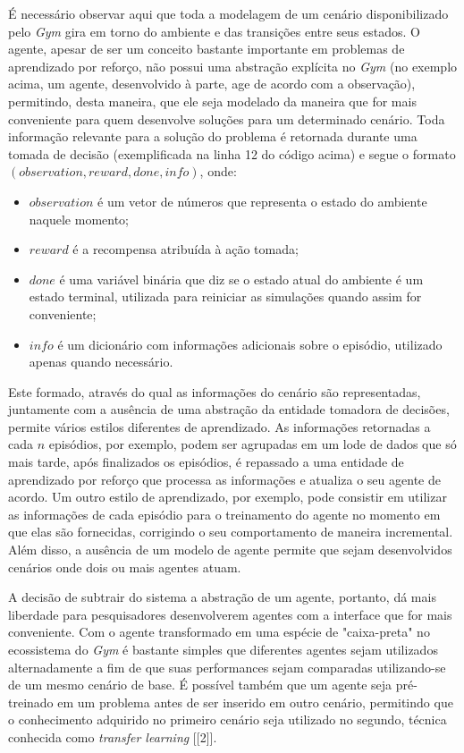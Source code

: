\documentclass[cic,tc]{iiufrgs}
\begin{document}
É necessário observar aqui que toda a modelagem de um cenário disponibilizado
pelo \textit{Gym} gira em torno do ambiente e das transições entre seus estados.
O agente, apesar de ser um conceito bastante importante em problemas de
aprendizado por reforço, não possui uma abstração explícita no \textit{Gym} (no
exemplo acima, um agente, desenvolvido à parte, age de acordo com a observação),
permitindo, desta maneira, que ele seja modelado da maneira que for mais
conveniente para quem desenvolve soluções para um determinado cenário. Toda
informação relevante para a solução do problema é retornada durante uma tomada
de decisão (exemplificada na linha 12 do código acima) e segue o formato
$(observation, reward, done, info)$, onde:

\begin{itemize}
  \item $observation$ é um vetor de números que representa o estado do ambiente
  naquele momento;
  \item $reward$ é a recompensa atribuída à ação tomada;
  \item $done$ é uma variável binária que diz se o estado atual do ambiente é
  um estado terminal, utilizada para reiniciar as simulações quando assim for
  conveniente;
  \item $info$ é um dicionário com informações adicionais sobre o episódio,
  utilizado apenas quando necessário.
\end{itemize}

Este formado, através do qual as informações do cenário são representadas,
juntamente com a ausência de uma abstração da entidade tomadora de decisões,
permite vários estilos diferentes de aprendizado. As informações retornadas a
cada $n$ episódios, por exemplo, podem ser agrupadas em um lode de dados que
só mais tarde, após finalizados os episódios, é repassado a uma entidade de
aprendizado por reforço que processa as informações e atualiza o seu agente de
acordo. Um outro estilo de aprendizado, por exemplo, pode consistir em utilizar
as informações de cada episódio para o treinamento do agente no momento em que
elas são fornecidas, corrigindo o seu comportamento de maneira incremental. Além
disso, a ausência de um modelo de agente permite que sejam desenvolvidos
cenários onde dois ou mais agentes atuam.


A decisão de subtrair do sistema a abstração de um agente, portanto, dá mais
liberdade para pesquisadores desenvolverem agentes com a interface que for mais
conveniente. Com o agente transformado em uma espécie de "caixa-preta" no
ecossistema do \textit{Gym} é bastante simples que diferentes agentes sejam
utilizados alternadamente a fim de que suas performances sejam comparadas
utilizando-se de um mesmo cenário de base. É possível também que um agente seja
pré-treinado em um problema antes de ser inserido em outro cenário, permitindo
que o conhecimento adquirido no primeiro cenário seja utilizado no segundo,
técnica conhecida como \textit{transfer learning} [[2]].
\end{document}

